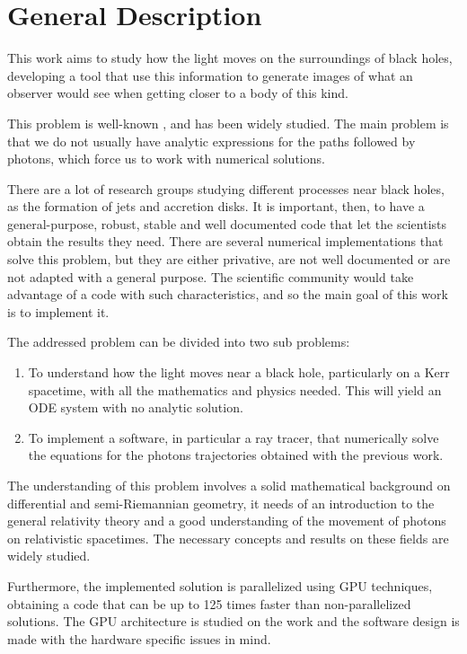 \chapter{General Description}

This work aims to study how the light moves on the surroundings of black holes, developing a tool that use this information to generate images of what an observer would see when getting closer to a body of this kind.

This problem is well-known \cite{oneill83} \cite{oneill95}, and has been widely studied. The main problem is that we do not usually have analytic expressions for the paths followed by photons, which force us to work with numerical solutions.

There are a lot of research groups studying different processes near black holes, as the formation of jets and accretion disks. It is important, then, to have a general-purpose, robust, stable and well documented code that let the scientists obtain the results they need. There are several numerical implementations \cite{thorne15} \cite{chan13} that solve this problem, but they are either privative, are not well documented or are not adapted with a general purpose. The scientific community would take advantage of a code with such characteristics, and so the main goal of this work is to implement it.

The addressed problem can be divided into two sub problems:
\begin{enumerate}
	\item To understand how the light moves near a black hole, particularly on a Kerr spacetime, with all the mathematics and physics needed. This will yield an \ac{ODE} system with no analytic solution.
	\item To implement a software, in particular a ray tracer, that numerically solve the equations for the photons trajectories obtained with the previous work.
\end{enumerate}

The understanding of this problem involves a solid mathematical background on differential and semi-Riemannian geometry, it needs of an introduction to the general relativity theory and a good understanding of the movement of photons on relativistic spacetimes. The necessary concepts and results on these fields are widely studied.

Furthermore, the implemented solution is parallelized using \ac{GPU} techniques, obtaining a code that can be up to 125 times faster than non-parallelized solutions. The \ac{GPU} architecture is studied on the work and the software design is made with the hardware specific issues in mind.

